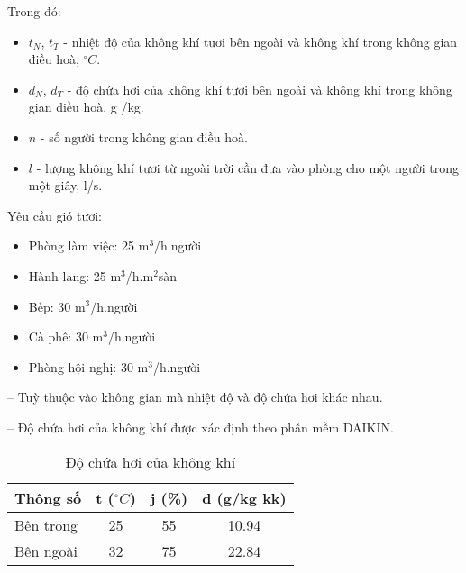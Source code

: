 Trong đó:
\begin{itemize}[leftmargin=2.2cm]
	\item $t_{N}$, $t_{T}$ - nhiệt độ của không khí tươi bên ngoài và không khí trong không gian điều hoà, $^{\circ}C$.
	\item $d_{N}$, $d_{T}$ - độ chứa hơi của không khí tươi bên ngoài và không khí trong không gian điều hoà, g /kg.
	\item $ n $ - số người trong không gian điều hoà.
	\item $l$ - lượng không khí tươi từ ngoài trời cần đưa vào phòng cho một người trong một giây, l/s.
\end{itemize}

Yêu cầu gió tươi:
\begin{itemize}[leftmargin=2.2cm, label={-}]
	\item Phòng làm việc: 25 m$^3$/h.người
	\item Hành lang: 25 m$^3$/h.m$^2$sàn
	\item Bếp: 30 m$^3$/h.người
	\item Cà phê: 30 m$^3$/h.người
	\item Phòng hội nghị: 30 m$^3$/h.người
\end{itemize}

-- Tuỳ thuộc vào không gian mà nhiệt độ và độ chứa hơi khác nhau.

-- Độ chứa hơi của không khí được xác định theo phần mềm DAIKIN.

\begin{table}[H]
	\centering
	\caption{Độ chứa hơi của không khí}
	\begin{tabular}{|p{7.645em}|c|c|c|}
		\hline
		\textbf{Thông số} & \multicolumn{1}{p{5.43em}|}{\textbf{t ($^{\circ}C$)}} & \multicolumn{1}{p{4.645em}|}{\textbf{j (\%)}} & \multicolumn{1}{p{5.785em}|}{\textbf{d (g/kg kk)}} \bigstrut\\
		\hline
		Bên trong & 25       & 55       & 10.94 \bigstrut\\
		\hline
		Bên ngoài & 32       & 75       & 22.84 \bigstrut\\
		\hline
	\end{tabular}%
	\label{b:dch}%
\end{table}%

